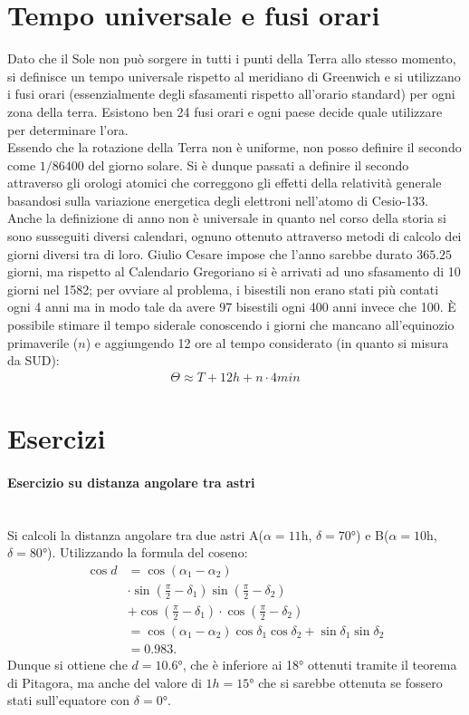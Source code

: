 \documentclass[a4paper, oneside]{book}
\begin{document}
\section{Tempo universale e fusi orari}
Dato che il Sole non può sorgere in tutti i punti della Terra
allo stesso momento, si definisce un tempo universale
rispetto al meridiano di Greenwich e si utilizzano i fusi orari
(essenzialmente degli sfasamenti rispetto all'orario standard) 
per ogni zona della terra. Esistono ben 24 fusi orari e ogni paese decide quale 
utilizzare per determinare l'ora. \\
Essendo che la rotazione della Terra non è uniforme, non posso definire il secondo come
$1/86400$ del giorno solare. Si è dunque passati a
definire il secondo attraverso gli orologi atomici che correggono gli
effetti della relatività generale basandosi sulla variazione energetica degli
elettroni nell'atomo di Cesio-133. Anche la definizione di anno non è universale in quanto
nel corso della storia si sono susseguiti diversi calendari, ognuno ottenuto attraverso
metodi di calcolo dei giorni diversi tra di loro. Giulio Cesare impose che
l'anno sarebbe durato $365.25$ giorni, ma rispetto al Calendario Gregoriano si è arrivati
ad uno sfasamento di 10 giorni nel 1582; per ovviare al problema, i bisestili non erano stati
più contati ogni 4 anni ma in modo tale da avere 97 bisestili ogni 400
anni invece che 100.
È possibile stimare il tempo siderale conoscendo i giorni che mancano all'equinozio primaverile
($n$) e aggiungendo 12 ore al tempo considerato (in quanto si misura da SUD):
\begin{align}
    \Theta \approx T + 12h + n \cdot 4min
\end{align}

\clearpage
\section{Esercizi}
\paragraph{Esercizio su distanza angolare tra astri} \mbox{} \\ 
Si calcoli la distanza angolare tra due astri A($\alpha = 11$h, $\delta = 70$°) e
B($\alpha = 10$h, $\delta = 80$°). Utilizzando la formula del coseno:
\begin{align*}
    \cos d &= \cos(\alpha_1 - \alpha_2)\\
    &\cdot \sin\left(\frac{\pi}{2} - \delta_1 \right)\sin\left(\frac{\pi}{2} - \delta_2\right) \\
    &+ \cos\left(\frac{\pi}{2} - \delta_1\right)\cdot \cos\left(\frac{\pi}{2} - \delta_2\right) \\
    &= \cos(\alpha_1 - \alpha_2) \cos\delta_1 \cos\delta_2 +\sin\delta_1\sin\delta_2\\
    &= 0.983.
\end{align*}
Dunque si ottiene che $d = 10.6$°, che è inferiore ai 18° ottenuti tramite il teorema di Pitagora, ma anche del valore di $1h = 15$° che si sarebbe 
ottenuta se fossero stati sull'equatore con $\delta = 0$°.  
\end{document}
